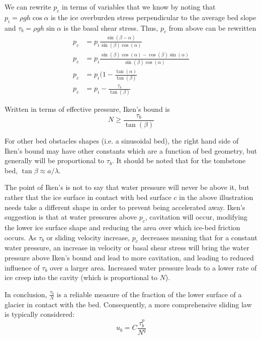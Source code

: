 \documentclass[12pt]{article}
\theoremstyle{definition}
\begin{document}
We can rewrite $p_c$ in terms of variables that we know by noting that $p_i = \rho g h \cos \alpha$ is the ice overburden stress perpendicular to the average bed slope and $\tau_b = \rho g h \sin \alpha$ is the basal shear stress. Thus, $p_c$ from above can be rewritten
\begin{align}
p_c &= p_i \frac{\sin(\beta-\alpha)}{\sin(\beta) \cos(\alpha)} \\
p_c &= p_i \frac{\sin(\beta) \cos(\alpha)-\cos(\beta) \sin(\alpha)}{\sin(\beta) \cos(\alpha)} \\
p_c &= p_i (1-\frac{\tan(\alpha)}{\tan(\beta)} \\
p_c &= p_i - \frac{\tau_b}{\tan(\beta)}
\end{align}
\begin{shaded}
Written in terms of effective pressure, Iken's bound is
\begin{equation}
N \geq \frac{\tau_b}{\tan(\beta)}
\end{equation}
\end{shaded}
For other bed obstacles shapes (i.e. a sinusoidal bed), the right hand side of Iken's bound may have other constants which are a function of bed geometry, but generally will be proportional to $\tau_b$. It should be noted that for the tombstone bed, $\tan \beta \approx a / \lambda$.

The point of Iken's is not to say that water pressure will never be above it, but rather that the ice surface in contact with bed surface $c$ in the above illustration needs take a different shape in order to prevent being accelerated away. Iken's suggestion is that at water pressures above $p_c$, cavitation will occur, modifying the lower ice surface shape and reducing the area over which ice-bed friction occurs. As $\tau_b$ or sliding velocity increase, $p_c$ decreases meaning that for a constant water pressure, an increase in velocity or basal shear stress will bring the water pressure above Iken's bound and lead to more cavitation, and leading to reduced influence of $\tau_b$ over a larger area. Increased water pressure leads to a lower rate of ice creep into the cavity (which is proportional to $N$).

\begin{shaded}
In conclusion, $\frac{\tau_b}{N}$ is a reliable measure of the fraction of the lower surface of a glacier in contact with the bed. Consequently, a more comprehensive sliding law is typically considered:
\begin{equation}
u_b = C \frac{\tau_b^p}{N^q}
\end{equation}
\end{shaded}



\end{document}
